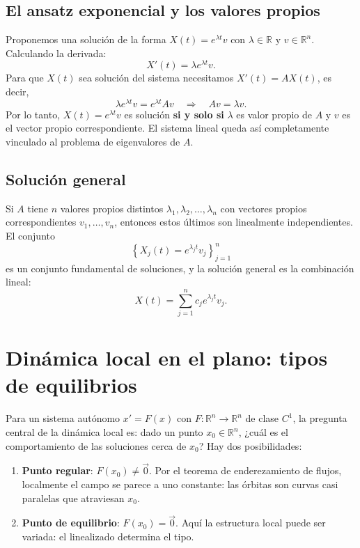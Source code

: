 \documentclass[11pt,letterpaper]{article}
\begin{document}
\subsection{El ansatz exponencial y los valores propios}

Proponemos una solución de la forma $X(t)=e^{\lambda t}v$ con
$\lambda\in\mathbb{R}$ y $v\in\mathbb{R}^n$. Calculando la derivada:
\[
X'(t)=\lambda e^{\lambda t}v.
\]
Para que $X(t)$ sea solución del sistema necesitamos $X'(t)=AX(t)$, es decir,
\[
\lambda e^{\lambda t}v = e^{\lambda t}Av \quad \Longrightarrow \quad Av=\lambda v.
\]
Por lo tanto, $X(t)=e^{\lambda t}v$ es solución \textbf{si y solo si} $\lambda$
es valor propio de $A$ y $v$ es el vector propio correspondiente. El sistema lineal
queda así completamente vinculado al problema de eigenvalores de $A$.

\subsection{Solución general}

Si $A$ tiene $n$ valores propios distintos $\lambda_1,\lambda_2,\ldots,\lambda_n$
con vectores propios correspondientes $v_1,\ldots,v_n$, entonces estos últimos son
linealmente independientes. El conjunto
\[
\left\{X_j(t)=e^{\lambda_j t}v_j\right\}_{j=1}^n
\]
es un conjunto fundamental de soluciones, y la solución general es la combinación lineal:
\[
X(t)=\sum_{j=1}^n c_j e^{\lambda_j t}v_j.
\]

\section{Dinámica local en el plano: tipos de equilibrios}
\label{sec:dinamica-local}

Para un sistema autónomo $x'=F(x)$ con $F:\mathbb{R}^n\to\mathbb{R}^n$ de
clase $C^1$, la pregunta central de la dinámica local es: dado un punto
$x_0\in\mathbb{R}^n$, ¿cuál es el comportamiento de las soluciones cerca de $x_0$?
Hay dos posibilidades:

\begin{enumerate}
    \item \textbf{Punto regular}: $F(x_0)\neq\vec{0}$. Por el teorema de
          enderezamiento de flujos, localmente el campo se parece a uno constante:
          las órbitas son curvas casi paralelas que atraviesan $x_0$.
    \item \textbf{Punto de equilibrio}: $F(x_0)=\vec{0}$. Aquí la estructura
          local puede ser variada: el linealizado determina el tipo.
\end{enumerate}
\end{document}
